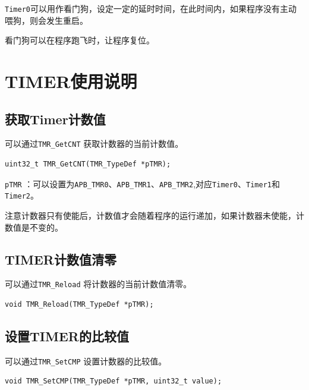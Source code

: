 \documentclass[
  12pt,
]{book}
\begin{document}
\texttt{Timer0}可以用作看门狗，设定一定的延时时间，在此时间内，如果程序没有主动喂狗，则会发生重启。

看门狗可以在程序跑飞时，让程序复位。

\hypertarget{timerux4f7fux7528ux8bf4ux660e}{%
\section{TIMER使用说明}\label{timerux4f7fux7528ux8bf4ux660e}}

\hypertarget{ux83b7ux53d6timerux8ba1ux6570ux503c}{%
\subsection{获取Timer计数值}\label{ux83b7ux53d6timerux8ba1ux6570ux503c}}

可以通过\texttt{TMR\_GetCNT} 获取计数器的当前计数值。

\begin{verbatim}
uint32_t TMR_GetCNT(TMR_TypeDef *pTMR);
\end{verbatim}

\texttt{pTMR} ：可以设置为\texttt{APB\_TMR0}、\texttt{APB\_TMR1}、\texttt{APB\_TMR2},对应\texttt{Timer0}、\texttt{Timer1}和\texttt{Timer2}。

注意计数器只有使能后，计数值才会随着程序的运行递加，如果计数器未使能，计数值是不变的。

\hypertarget{timerux8ba1ux6570ux503cux6e05ux96f6}{%
\subsection{TIMER计数值清零}\label{timerux8ba1ux6570ux503cux6e05ux96f6}}

可以通过\texttt{TMR\_Reload} 将计数器的当前计数值清零。

\begin{verbatim}
void TMR_Reload(TMR_TypeDef *pTMR);
\end{verbatim}

\hypertarget{ux8bbeux7f6etimerux7684ux6bd4ux8f83ux503c}{%
\subsection{设置TIMER的比较值}\label{ux8bbeux7f6etimerux7684ux6bd4ux8f83ux503c}}

可以通过\texttt{TMR\_SetCMP} 设置计数器的比较值。

\begin{verbatim}
void TMR_SetCMP(TMR_TypeDef *pTMR, uint32_t value);
\end{verbatim}
\end{document}
